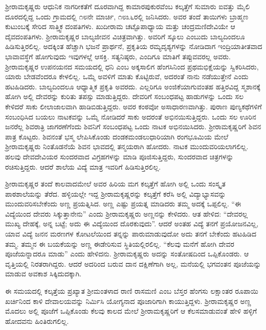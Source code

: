 ಶ‍್ರೀರಾಮಕೃಷ್ಣರು ಆಧುನಿಕ ನಾಗರೀಕತೆಗೆ ದೂರವಾಗಿದ್ದ ಕಾಮಾರಪುಕುರವೆಂಬ ಕಲ್ಕತ್ತೆಗೆ ಸುಮಾರು ಐವತ್ತು ಮೈಲಿ ದೂರದಲ್ಲಿದ್ದ ಒಂದು ಗ್ರಾಮದಲ್ಲಿ ೧೮ನೇ ಮಾರ್ಚಿ, ೧೮೩೬ರಲ್ಲಿ ಜನಿಸಿದರು. ಅವರ ತಂದೆ ತಾಯಿಗಳು ಬ್ರಾಹ್ಮಣ ಕುಟುಂಬಕ್ಕೆ ಸೇರಿದ ಸಾತ್ತ್ವಿಕ ದಂಪತಿಗಳು. ಖುದೀರಾಮ ಚಟ್ಟೊಪಾಧ್ಯಾಯ ಮತ್ತು ಚಂದ್ರಮಣಿದೇವಿಯೇ ಆ ದೈವದಂಪತಿಗಳು. ಶ‍್ರೀರಾಮಕೃಷ್ಣರ ಬಾಲ್ಯಜೀವನ ವಿಚಿತ್ರವಾಗಿತ್ತು. ಅವರಿಗೆ ಸ್ಕೂಲು ಎಂಬುದು ಬಾಲ್ಯದಿಂದಲೂ ಹಿಡಿಸುತ್ತಿರಲಿಲ್ಲ. ಅದಕ್ಕಿಂತ ಹೆಚ್ಚಾಗಿ ಭಜನೆ ಪ್ರಾರ್ಥನೆ, ಪ್ರಕೃತಿಯ ರಮ್ಯದೃಶ್ಯಗಳನ್ನು ನೋಡಿದಾಗ ಇಂದ್ರಿಯಾತೀತವಾದ ಭಾವಾವಸ್ಥೆಗೆ ಹೋಗುವುದು ಇವುಗಳಲ್ಲೆ ಆಸಕ್ತಿ. ಸತ್ಯನಿಷ್ಠರು, ಎಂದಿಗೂ ಮಾತಿಗೆ ತಪ್ಪುವವರಲ್ಲ ಅವರು. ಶ‍್ರೀರಾಮಕೃಷ್ಣರ ಉಪನಯನದ ಸಮಯದಲ್ಲಿ ಧನಿ ಎಂಬ ಅಕ್ಕಸಾಲಿಗ ಹೆಂಗಸಿನಿಂದ ಪ್ರಥಮಭಿಕ್ಷೆಯನ್ನು ಸ್ವಿಕರಿಸಿದರು, ಯಾರು ಬೇಡವೆಂದರೂ ಕೇಳಲಿಲ್ಲ. ಒಮ್ಮೆ ಅವಳಿಗೆ ಮಾತು ಕೊಟ್ಟಿರುವೆ, ಅದರಂತೆ ನಾನು ನಡೆಯುತ್ತೇನೆ ಎಂದು ಹಟಹಿಡಿದರು. ಬಾಲ್ಯದಿಂದಲೂ ಆಧ್ಯಾತ್ಮಿಕ ಪ್ರಕೃತಿ ಅವರದು. ಎಲ್ಲರಿಗೂ ಅಂಜಿಕೆಯಾಗುವಂತಹ ಹತ್ತಿರವಿದ್ದ ಸ್ಮಶಾನಕ್ಕೆ ಹೋಗಿ ಅಲ್ಲಿ ದೇವರನ್ನು ಕುರಿತು ತಪಸ್ಸು ಮಾಡುತ್ತಿದ್ದರು. ದೇವರಿಗೆ ಸಂಬಂಧಪಟ್ಟ ಹಾಡುಗಳನ್ನು ಒಂದು ಸಲ ಕೇಳಿದರೆ ಸಾಕು ಲೀಲಾಜಾಲವಾಗಿ ಹಾಡಿಬಿಡುತ್ತಿದ್ದರು. ಅವರ ಕಂಠವೋ ಅಸಾಧಾರಣವಾಗಿತ್ತು. ಪುರಾಣ ಪುಣ್ಯಕಥೆಗಳಿಗೆ ಸಂಬಂಧಿಸಿದ ಬಯಲು ನಾಟಕವನ್ನು ಒಮ್ಮೆ ನೋಡಿದರೆ ಸಾಕು ಅದರಂತೆ ಅಭಿನಯಿಸುತ್ತಿದ್ದರು. ಒಂದು ಸಲ ಊರಿನ ಜನರೆಲ್ಲ ಶಿವರಾತ್ರಿ ಜಾಗರಣೆಗೆಂದು ಶಿವನಿಗೆ ಸಂಬಂಧಪಟ್ಟ ಒಂದು ನಾಟಕ ಅಭಿನಯಿಸಿದರು. ಶ‍್ರೀರಾಮಕೃಷ್ಣರಿಗೆ ಶಿವನ ಪಾತ್ರ ಕೊಟ್ಟರು. ಶಿವನಂತೆ ಭಸ್ಮ ಲೇಪಿಸಿಕೊಂಡು ದಂಡಕಮಂಡಲುಧಾರಿಯಾಗಿ ರಂಗಭೂಮಿಯ ಮೇಲೆ ಶ‍್ರೀರಾಮಕೃಷ್ಣರು ನಿಂತೊಡನೆಯೆ ಶಿವನ ಭಾವದಲ್ಲಿ ತನ್ಮಯರಾಗಿ ಹೋದರು. ನಾಟಕ ಮುಂದುವರಿಯಲಾಗಲಿಲ್ಲ. ಹಲವು ದೇವದೇವಿಯರ ಸುಂದರವಾದ ವಿಗ್ರಹಗಳನ್ನು ಮಾಡಿ ಪೂಜಿಸುತ್ತಿದ್ದರು, ಸುಂದರವಾದ ಚಿತ್ರಗಳನ್ನು ರಚಿಸುತ್ತಿದ್ದರು. ಆದರೆ ಶಾಲೆಯ ವಿದ್ಯೆ ಮಾತ್ರ ಇವರಿಗೆ ಹಿಡಿಸುತ್ತಿರಲಿಲ್ಲ.

ಶ‍್ರೀರಾಮಕೃಷ್ಣರ ತಂದೆ ಕಾಲವಾದಮೇಲೆ ಅವರ ಹಿರಿಯ ಮಗ ಕಲ್ಕತ್ತೆಗೆ ಹೋಗಿ ಅಲ್ಲಿ ಒಂದು ಸಂಸ್ಕೃತ ಪಾಠಶಾಲೆಯನ್ನು ತೆರೆದ. ಹಳ್ಳಿಯಲ್ಲೇ ಇದ್ದ ಶ‍್ರೀರಾಮಕೃಷ್ಣರನ್ನು ಕಲ್ಕತ್ತೆಗೆ ಕರೆಸಿ ಅಲ್ಲಿ ವಿದ್ಯಾಭ್ಯಾಸವನ್ನು ಮುಂದುವರಿಸಬೇಕೆಂದು ಅಣ್ಣ ಪ್ರಯತ್ನಿಸಿದ. ಅಣ್ಣ ಎಷ್ಟು ಪ್ರಯತ್ನ ಮಾಡಿದರು ತಮ್ಮ ಅದಕ್ಕೆ ಒಪ್ಪಲಿಲ್ಲ. “ಈ ವಿದ್ಯೆಯಿಂದ ದೇವರು ಸಿಕ್ಕುತ್ತಾನೇನು” ಎಂದು ಶ‍್ರೀರಾಮಕೃಷ್ಣರು ಅಣ್ಣನನ್ನು ಕೇಳಿದರು. ಆತ ಹೇಳಿದ: “ದೇವರಲ್ಲ ಮುಖ್ಯ ದೇಹಕ್ಕೆ, ಅನ್ನ ಬಟ್ಟೆ; ಅದು ಈ ವಿದ್ಯೆಯಿಂದ ದೊರಕುವುದು”. ಆದರೆ ಅಂತಹ ವಿದ್ಯೆ ತನಗೆ ಪ್ರಯೋಜನವಿಲ್ಲ, ಯಾವ ವಿದ್ಯೆ ಜನನ ಮರಣಗಳ ಕೋಟಲೆಯಿಂದ ತನ್ನನ್ನು ಪಾರುಮಾಡುವುದೋ ಅದು ತನಗೆ ಬೇಕೆಂದು ಹಟಹಿಡಿದ ತಮ್ಮ. ತಮ್ಮನ ಈ ಬಯಕೆಯನ್ನು ಅಣ್ಣ ಈಡೇರಿಸುವ ಸ್ಥಿತಿಯಲ್ಲಿರಲಿಲ್ಲ. “ಕೆಲವು ಮನೆಗೆ ಹೋಗಿ ದೇವರ ಪೂಜೆಯನ್ನಾದರೂ ಮಾಡು” ಎಂದು ಹೇಳಿದನು. ಶ‍್ರೀರಾಮಕೃಷ್ಣರು ಅದನ್ನು ಸಂತೋಷದಿಂದ ಒಪ್ಪಿಕೊಂಡರು. ಆ ವೃತ್ತಿಯಲ್ಲಿ ನಿರತರಾಗಿದ್ದರು. ಆದರೆ ಅದರಿಂದ ಬರುವ ದಾನ ದಕ್ಷಿಣೆಗಾಗಿ ಅಲ್ಲ, ಮನೆಯಲ್ಲಿ ಭಗವಂತನ ಪೂಜೆಯನ್ನು ಮಾಡುವ ಅವಕಾಶ ಸಿಕ್ಕಿದುದಕ್ಕಾಗಿ.

ಈ ಸಮಯದಲ್ಲಿ ಕಲ್ಕತ್ತೆಯ ಪ್ರಖ್ಯಾತ ಶ‍್ರೀಮಂತಳಾದ ರಾಣಿ ರಾಸಮಣಿ ಎಂಬ ಬೆಸ್ತರ ಹೆಂಗಸು ಲಕ್ಷಾಂತರ ರೂಪಾಯಿ ಖರ್ಚಿನಿಂದ ಕಾಳಿ ದೇವಾಲಯವನ್ನು ನಿರ್ಮಿಸಿ ಯೋಗ್ಯನಾದ ಪೂಜಾರಿಗಾಗಿ ಕಾಯುತ್ತಿದ್ದಳು. ಶ‍್ರೀರಾಮಕೃಷ್ಣರ ಅಣ್ಣ ಮೊದಲು ಅಲ್ಲಿ ಪೂಜೆಗೆ ಒಪ್ಪಿಕೊಂಡು ಕೆಲವು ಕಾಲದ ಮೇಲೆ ಶ‍್ರೀರಾಮಕೃಷ್ಣರಿಗೆ ಆ ಕೆಲಸಮಾಡುವಂತೆ ಹೇಳಿ ಹಳ್ಳಿಗೆ ಹೋದವನು ಹಿಂತಿರುಗಲಿಲ್ಲ.

